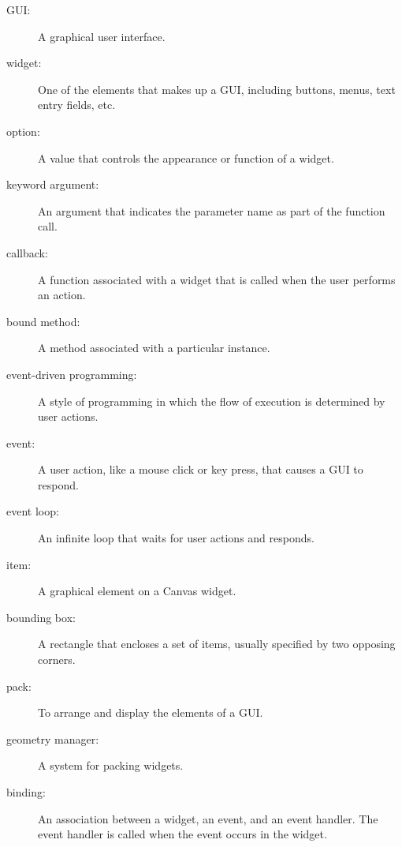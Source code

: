 \documentclass[10pt]{book}
\begin{document}
\begin{description}

\item[GUI:] A graphical user interface.

\item[widget:] One of the elements that makes up a GUI, including
buttons, menus, text entry fields, etc.

\item[option:] A value that controls the appearance or function of
a widget.

\item[keyword argument:] An argument that indicates the parameter
name as part of the function call.

\item[callback:] A function associated with a widget that is
called when the user performs an action.

\item[bound method:] A method associated with a particular instance.

\item[event-driven programming:] A style of programming in which
the flow of execution is determined by user actions.

\item[event:] A user action, like a mouse click or key press, that
causes a GUI to respond.

\item[event loop:] An infinite loop that waits for user actions
and responds.

\item[item:] A graphical element on a Canvas widget.

\item[bounding box:] A rectangle that encloses a set of items,
usually specified by two opposing corners.

\item[pack:] To arrange and display the elements of a GUI.

\item[geometry manager:] A system for packing widgets.

\item[binding:] An association between a widget, an event, and
an event handler.  The event handler is called when the event
occurs in the widget.

\end{description}
\end{document}
